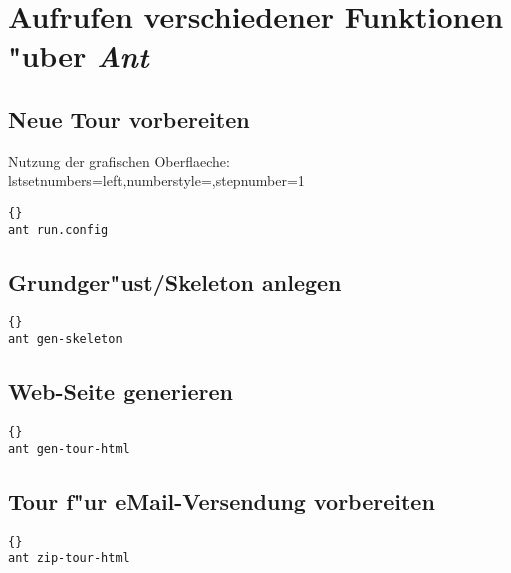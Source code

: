 \section{Aufrufen verschiedener Funktionen "uber \textit{Ant}}\label{sec:ant-calls}

\subsection{Neue Tour vorbereiten}
Nutzung der grafischen Oberflaeche:
lstset{numbers=left,numberstyle=\tiny,stepnumber=1}
\begin{lstlisting}{}
ant run.config
\end{lstlisting}

\subsection{Grundger"ust/Skeleton anlegen}
\lstset{numbers=left,numberstyle=\tiny,stepnumber=1}
\begin{lstlisting}{}
ant gen-skeleton
\end{lstlisting}


\subsection{Web-Seite generieren}
\lstset{numbers=left,numberstyle=\tiny,stepnumber=1}
\begin{lstlisting}{}
ant gen-tour-html
\end{lstlisting}

\subsection{Tour f"ur eMail-Versendung vorbereiten}
\lstset{numbers=left,numberstyle=\tiny,stepnumber=1}
\begin{lstlisting}{}
ant zip-tour-html
\end{lstlisting}
